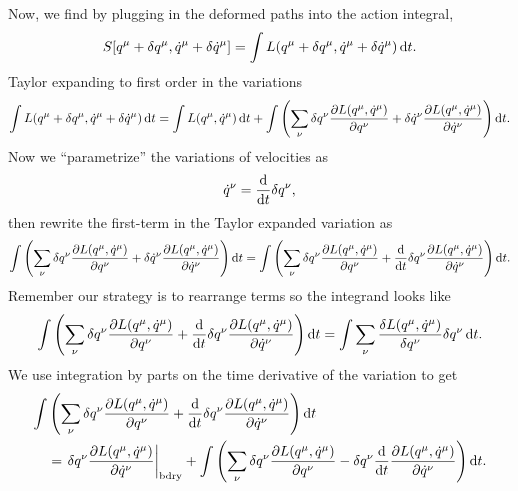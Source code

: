 \M
Now, we find by plugging in the deformed paths into the action integral,
\begin{equation}
  S[q^{\mu} + \delta q^{\mu}, \dot{q}^{\mu} + \delta\dot{q}^{\mu}]
  = \int L(q^{\mu} + \delta q^{\mu}, \dot{q}^{\mu} + \delta\dot{q}^{\mu})\,\mathrm{d} t.
\end{equation}
Taylor expanding to first order in the variations
\begin{equation}
\int L(q^{\mu} + \delta q^{\mu}, \dot{q}^{\mu} +
\delta\dot{q}^{\mu})\,\mathrm{d} t
= \int L(q^{\mu}, \dot{q}^{\mu})\,\mathrm{d} t
+ \int \left(\sum_{\nu} \delta q^{\nu}\frac{\partial L(q^{\mu}, \dot{q}^{\mu})}{\partial q^{\nu}}
+\delta \dot{q}^{\nu}\frac{\partial L(q^{\mu}, \dot{q}^{\mu})}{\partial \dot{q}^{\nu}}\right)\mathrm{d} t.
\end{equation}
Now we ``parametrize'' the variations of velocities as
\begin{equation}
\dot{q}^{\nu} = \frac{\mathrm{d}}{\mathrm{d} t}\delta q^{\nu},
\end{equation}
then rewrite the first-term in the Taylor expanded variation as
\begin{equation}
\int \left(\sum_{\nu} \delta q^{\nu}\frac{\partial L(q^{\mu}, \dot{q}^{\mu})}{\partial q^{\nu}}
+\delta \dot{q}^{\nu}\frac{\partial L(q^{\mu}, \dot{q}^{\mu})}{\partial \dot{q}^{\nu}}\right)\mathrm{d} t
= \int \left(\sum_{\nu} \delta q^{\nu}\frac{\partial L(q^{\mu}, \dot{q}^{\mu})}{\partial q^{\nu}}
+\frac{\mathrm{d}}{\mathrm{d} t}\delta q^{\nu}\frac{\partial L(q^{\mu}, \dot{q}^{\mu})}{\partial \dot{q}^{\nu}}\right)\mathrm{d} t.
\end{equation}
Remember our strategy is to rearrange terms so the integrand looks like
\begin{equation}
\int \left(\sum_{\nu} \delta q^{\nu}\frac{\partial L(q^{\mu}, \dot{q}^{\mu})}{\partial q^{\nu}}
+\frac{\mathrm{d}}{\mathrm{d} t}\delta q^{\nu}\frac{\partial L(q^{\mu}, \dot{q}^{\mu})}{\partial \dot{q}^{\nu}}\right)\mathrm{d} t
= \int\sum_{\nu}\frac{\delta L(q^{\mu},
    \dot{q}^{\mu})}{\delta q^{\nu}}\delta q^{\nu}\,\mathrm{d} t.
\end{equation}
We use integration by parts on the time derivative of the variation to get
\begin{equation}
  \begin{split}
\int &\left(\sum_{\nu} \delta q^{\nu}\frac{\partial L(q^{\mu}, \dot{q}^{\mu})}{\partial q^{\nu}}
+\frac{\mathrm{d}}{\mathrm{d} t}\delta q^{\nu}\frac{\partial L(q^{\mu}, \dot{q}^{\mu})}{\partial \dot{q}^{\nu}}\right)\mathrm{d} t\\
&=\left.\delta q^{\nu}\frac{\partial L(q^{\mu}, \dot{q}^{\mu})}{\partial \dot{q}^{\nu}}\right|_{\text{bdry}}
+\int \left(\sum_{\nu} \delta q^{\nu}\frac{\partial L(q^{\mu}, \dot{q}^{\mu})}{\partial q^{\nu}}
-\delta q^{\nu}\frac{\mathrm{d}}{\mathrm{d} t}\frac{\partial L(q^{\mu}, \dot{q}^{\mu})}{\partial \dot{q}^{\nu}}\right)\mathrm{d} t.
  \end{split}
\end{equation}
